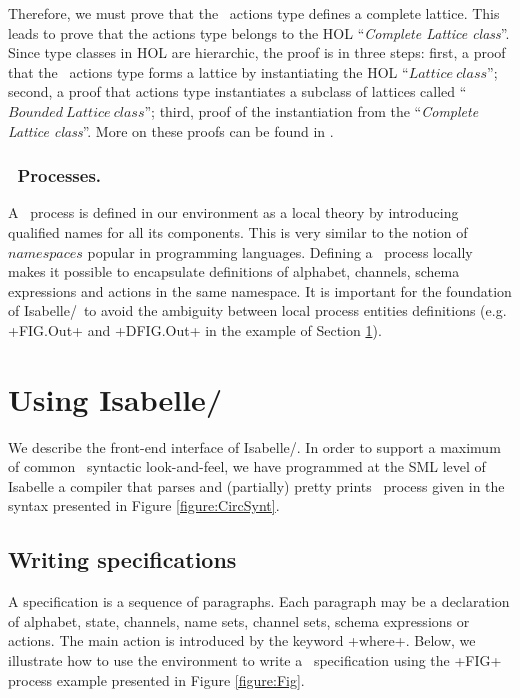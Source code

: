 \documentclass[11pt,a4paper]{article}
\begin{document}
Therefore, we must prove that the \Circus\ actions type defines a complete lattice. 
This leads to prove that the actions type belongs to the HOL ``\emph{Complete Lattice class}''. Since type classes in HOL are hierarchic, 
the proof is in three steps: first, a proof that the \Circus\ actions type forms a lattice by instantiating the HOL ``$Lattice~class$''; second, a
proof that actions type instantiates a subclass of lattices called ``$Bounded~Lattice~class$''; third, proof of the instantiation from the ``\emph{Complete Lattice class}''. %
More on these proofs can be found in \cite{fgw11rapport-lri}.

\subsubsection{\Circus\ Processes.}
A \Circus\ process is defined in our environment as a local theory by introducing qualified names for all its components. This is very similar to the 
notion of $namespaces$ popular in programming languages. Defining a \Circus\ process locally makes it possible to encapsulate definitions of alphabet, 
channels, schema expressions and actions in the same namespace. It is important for the foundation of Isabelle/\Circus\ to avoid the ambiguity 
between local process entities definitions (e.g. \inlineisar+FIG.Out+ and \inlineisar+DFIG.Out+ in the example of Section \ref{Section:framework}). 

\section{Using  Isabelle/\Circus\ }\label{Section:framework}
We describe the front-end interface of Isabelle/\Circus .
 In order to support a maximum of common \Circus\ syntactic look-and-feel, we have programmed
at the SML level of Isabelle a compiler that parses and (partially) pretty prints \Circus\ process given in the syntax presented 
in Figure \ref{figure:CircSynt}.

\subsection{Writing specifications}
A specification is a sequence of paragraphs.
Each paragraph may be a declaration of alphabet, state, channels, name sets, channel sets, schema expressions or actions. 
The main action is introduced by the keyword \inlineisar+where+.
Below, we illustrate how to use the environment to write a \Circus\ specification using the \inlineisar+FIG+ process example presented in Figure \ref{figure:Fig}.
\end{document}
